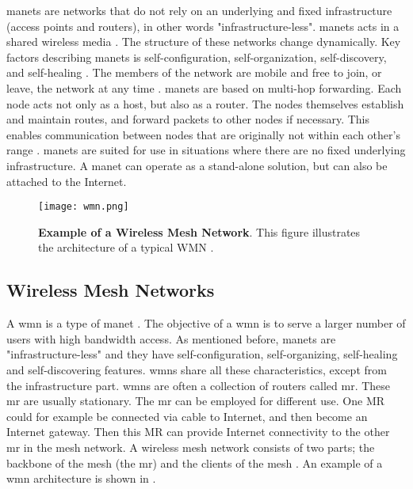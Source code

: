 \glspl{manet} are networks that do not rely on an underlying and fixed infrastructure (access points and routers), in other words "infrastructure-less". \glspl{manet} acts in a shared wireless media \cite{adhoc}. The structure of these networks change dynamically. Key factors describing \glspl{manet} is self-configuration, self-organization, self-discovery, and self-healing \cite{wmn}. The members of the network are mobile and free to join, or leave, the network at any time \cite{adhoc2}. \glspl{manet} are based on multi-hop forwarding. Each node acts not only as a host, but also as a router. The nodes themselves establish and maintain routes, and forward packets to other nodes if necessary. This enables communication between nodes that are originally not within each other's range \cite{adhoc2}. \glspl{manet} are suited for use in situations where there are no fixed underlying infrastructure. A \gls{manet} can operate as a stand-alone solution, but can also be attached to the Internet. 

\begin{figure}[b]
  \centering
    \texttt{[image: wmn.png]}
     \caption [Example of a Wireless Mesh Network]{\textbf{Example of a Wireless Mesh Network}. This figure illustrates the architecture of a typical WMN \cite{wmn}.}
\label{fig:wmn}
\end{figure}

\subsection{Wireless Mesh Networks}
\label{subsec:mesh}
A \gls{wmn} is a type of \gls{manet} \cite{wmn}. The objective of a \gls{wmn} is to serve a larger number of users with high bandwidth access. As mentioned before, \glspl{manet} are "infrastructure-less" and they have self-configuration, self-organizing, self-healing and self-discovering features. \glspl{wmn} share all these characteristics, except from the infrastructure part. \glspl{wmn} are often a collection of routers called \gls{mr}. These \gls{mr} are usually stationary. The \gls{mr} can be employed for different use. One MR could for example be connected via cable to Internet, and then become an Internet gateway. Then this MR can provide Internet connectivity to the other \gls{mr} in the mesh network. A wireless mesh network consists of two parts; the backbone of the mesh (the \gls{mr}) and the clients of the mesh \cite{wmn}. An example of a \gls{wmn} architecture is shown in . 


